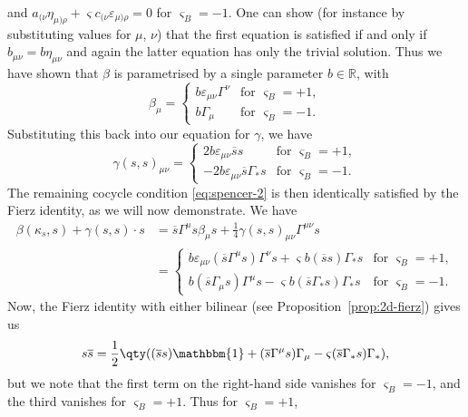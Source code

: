 \documentclass[10pt,a4paper]{amsart}
\numberwithin{equation}{section}
\newcommand{\RR}{\mathbb{R}}
\newcommand{\1}{\mathbbm{1}}
\begin{document}
 and $
	a_{(\nu}\eta_{\mu)\rho}+\varsigma c_{(\nu}\varepsilon_{\mu)\rho} = 0$
 for $ \varsigma_B=-1$.
One can show (for instance by substituting values for $\mu$, $\nu$) that the first equation is satisfied if and only if $b_{\mu\nu}=b\eta_{\mu\nu}$ and again the latter equation has only the trivial solution. Thus we have shown that $\beta$ is parametrised by a single parameter $b\in \RR$, with
\begin{equation}\label{eq:2d-real-beta-soln}
	\beta_\mu =
	\begin{cases}
		b\varepsilon_{\mu\nu}\Gamma^\nu	& \text{for } \varsigma_B=+1,\\
		b\Gamma_\mu						& \text{for } \varsigma_B=-1.
	\end{cases}
\end{equation}
Substituting this back into our equation for $\gamma$, we have
\begin{equation}\label{eq:2d-real-gamma-soln}
	\gamma(s,s)_{\mu\nu} =
	\begin{cases}
		2b\varepsilon_{\mu\nu}\overline{s}s				& \text{for } \varsigma_B=+1,\\
		-2b\varepsilon_{\mu\nu}\overline{s}\Gamma_*s	& \text{for } \varsigma_B=-1.
	\end{cases}
\end{equation}
The remaining cocycle condition \eqref{eq:spencer-2} is then identically satisfied by the Fierz identity, as we will now demonstrate. We have
\begin{align*}
	\beta(\kappa_s,s) + \gamma(s,s)\cdot s
		&= \overline{s}\Gamma^\mu s \beta_\mu s + \frac{1}{4}\gamma(s,s)_{\mu\nu}\Gamma^{\mu\nu}s	\\
		&=
			\begin{cases}
				b\varepsilon_{\mu\nu}(\overline{s}\Gamma^\mu s)\Gamma^\nu s + \varsigma b(\overline{s}s)\Gamma_* s	& \text{for } \varsigma_B=+1, 	\\
				b(\overline{s}\Gamma_\mu s)\Gamma^\mu s - \varsigma b(\overline{s}\Gamma_* s)\Gamma_* s & \text{for } \varsigma_B=-1.
			\end{cases}
\end{align*}
Now, the Fierz identity with either bilinear (see Proposition~\ref{prop:2d-fierz}) gives us
\[
	s\overline{s} = \frac{1}{2}\qty((\overline{s}s)\1 + (\overline{s}\Gamma^\mu s)\Gamma_\mu - \varsigma(\overline{s}\Gamma_* s) \Gamma_*),
\]
but we note that the first term on the right-hand side vanishes for $\varsigma_B=-1$, and the third vanishes for $\varsigma_B=+1$. Thus for $\varsigma_B=+1$,
\end{document}
